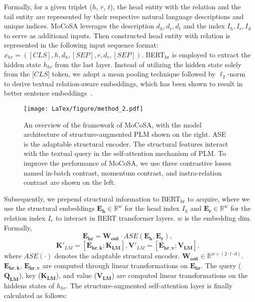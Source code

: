 \documentclass[11pt]{article}
\begin{document}
Formally, for a given triplet ($h$, $r$, $t$), the head entity with the relation and the tail entity are represented by their respective natural language descriptions and unique indices. MoCoSA leverages the description $d_{h}, d_{r}, d_{t}$ and the index $I_{h}, I_{r}, I_{d}$ to serve as additional inputs. Then constructed head entity with relation is represented in the following input sequence format: $x_{hr} = ([CLS], h, d_{h}, [SEP], r, d_{r}, [SEP])$. BERT$_{\text{hr}}$ is employed to extract the hidden state $h_{hr}$ from the last layer. Instead of utilizing the hidden state solely from the [$CLS$] token, we adopt a mean pooling technique followed by $\ell_{2}$-norm to derive textual relation-aware embeddings, which has been shown to result in better sentence embeddings~\cite{gao2021simcse,Reimers2019SentenceBERTSE}. 
\begin{figure*}[!htb]
  \centering
\texttt{[image: LaTex/figure/method\_2.pdf]}
\caption{An overview of the framework of MoCoSA, with the model architecture of structure-augmented PLM shown on the right. ASE is the adaptable structural encoder. The structural features interact with the textual query in the self-attention mechanism of PLM. To improve the performance of MoCoSA, we use three contrastive losses named in-batch 
 contrast, momentum contrast, and instra-relation contrast are shown on the left.}
  \label{fig:method_2}
\vspace{-5pt}
\end{figure*}
Subsequently, we prepend structural information to BERT$_{\text{hr}}$ to acquire, where we use the structural embeddings $\mathbf{E_{h}}\in \mathbb{R}^w$ for the head index $I_{h}$ and $\mathbf{E_{r}}\in \mathbb{R}^w$ for the relation index $I_{r}$ to interact in BERT transformer layers. $w$ is the embedding dim. Formally,
\begin{equation}
    \mathbf{E_{hr}}=\mathbf{W_{out}} \cdot ASE(\mathbf{E_{h}}, \mathbf{E_{r}}),
\end{equation}
\begin{equation}
    \mathbf{K}'_{LM}=[\mathbf{E_{hr,k}};\mathbf{K_{LM}}],  \mathbf{V}'_{LM}=[\mathbf{E_{hr,v}};\mathbf{V_{LM}}].
\end{equation}
where $ASE(\cdot)$ denotes the adaptable structural encoder. $\mathbf{W_{out}}\in \mathbb{R}^{w \times (2 \cdot l \cdot d)}$. $\mathbf{E_{hr,k}}$, $\mathbf{E_{hr,v}}$ are computed through linear transformations on $\mathbf{E_{hr}}$. 
The query ($\mathbf{Q_{LM}}$), key ($\mathbf{K_{LM}}$), and value ($\mathbf{V_{LM}}$) are computed linear transformations on the hiddens states of $h_{hr}$. The structure-augmented self-attention layer is finally calculated as follows:
\end{document}

